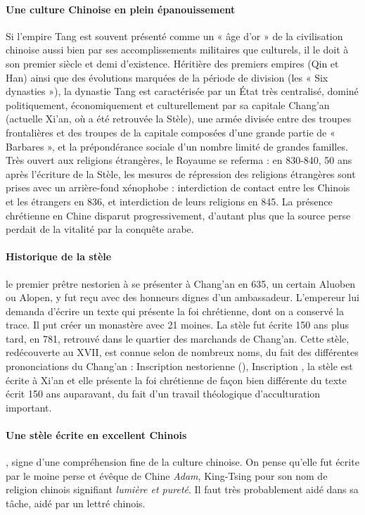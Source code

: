  \paragraph{Une culture Chinoise en plein épanouissement} Si l'empire Tang est souvent présenté comme un « âge d'or » de la civilisation chinoise aussi bien par ses accomplissements militaires que culturels, il le doit à son premier siècle et demi d'existence. Héritière des premiers empires (Qin et Han) ainsi que des évolutions marquées de la période de division (les « Six dynasties »), la dynastie Tang est caractérisée par un État très centralisé, dominé politiquement, économiquement et culturellement par sa capitale Chang'an (actuelle Xi'an, où a été retrouvée la Stèle), une armée divisée entre des troupes frontalières et des troupes de la capitale composées d'une grande partie de « Barbares », et la prépondérance sociale d'un nombre limité de grandes familles.
 Très ouvert aux religions étrangères, le Royaume se referma  : en 830-840, 50 ans après l'écriture de la Stèle, les mesures de répression des religions étrangères sont prises avec un arrière-fond xénophobe : interdiction de contact entre les Chinois et les étrangers en 836, et interdiction de leurs religions en 845. La présence chrétienne en Chine disparut progressivement, d'autant plus que la source perse perdait de la vitalité par la conquête arabe.
 
\paragraph{Historique de la stèle}
le
premier prêtre nestorien à se présenter à Chang'an en 635, un
certain Aluoben ou Alopen, y fut reçu avec des honneurs dignes d'un ambassadeur. L'empereur lui demanda d'écrire un texte qui présente la foi chrétienne, dont on a conservé la trace. Il put créer un monastère avec 21 moines. 
La stèle fut écrite 150 ans plus tard, en 781, retrouvé dans le quartier des marchands de Chang'an. Cette stèle, redécouverte au XVII, est connue selon de nombreux noms, du fait des différentes prononciations du Chang'an : Inscription nestorienne (\cite{saeki:nestorianDocumentsChine}), Inscription , la stèle est écrite à Xi'an et elle présente la foi chrétienne de façon bien différente du texte écrit 150 ans auparavant, du fait d'un travail théologique d'acculturation important. 


\paragraph{Une stèle écrite en excellent Chinois}, signe d'une compréhension fine de la culture chinoise. On pense qu'elle fut écrite par le moine perse et évêque de Chine \textit{Adam},  King-Tsing pour son nom de religion chinois signifiant \textit{lumière et pureté}. Il faut très probablement aidé dans sa tâche, aidé par un lettré chinois. \cite[p.~5]{Havret:stelechretienne}

